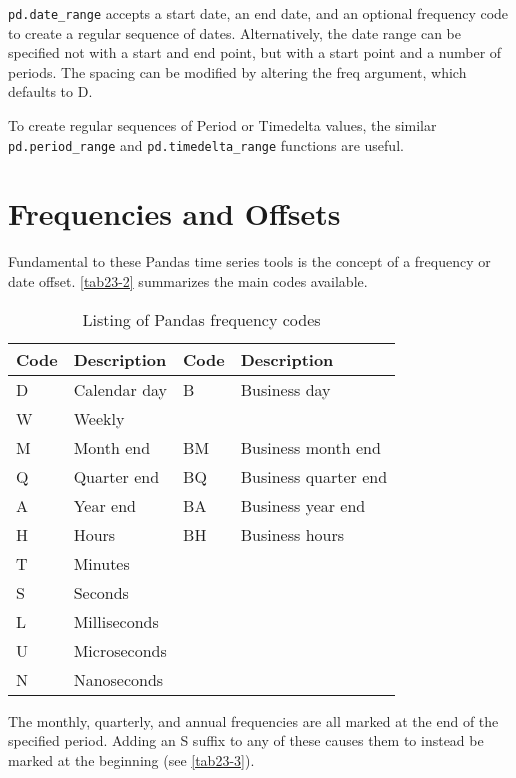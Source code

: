 \verb|pd.date_range| accepts a start date, an end date, and an optional
frequency code to create a regular sequence of dates. Alternatively, the date range can be specified not with a start and end point, but with
a start point and a number of periods. The spacing can be modified by altering the freq argument, which defaults to D.


To create regular sequences of Period or Timedelta values, the similar
\verb|pd.period_range| and \verb|pd.timedelta_range| functions are useful.

\section{Frequencies and Offsets}
Fundamental to these Pandas time series tools is the concept of a frequency or date
offset. \autoref{tab23-2} summarizes the main codes available.
\begin{table}
    \centering
    \caption{Listing of Pandas frequency codes}
    \label{tab23-2}
    \begin{tabular}{llll}
        \hline
        Code & Description  & Code & Description          \\
        \hline
        D    & Calendar day & B    & Business day         \\
        W    & Weekly       &      &                      \\
        M    & Month end    & BM   & Business month end   \\
        Q    & Quarter end  & BQ   & Business quarter end \\
        A    & Year end     & BA   & Business year end    \\
        H    & Hours        & BH   & Business hours       \\
        T    & Minutes      &      &                      \\
        S    & Seconds      &      &                      \\
        L    & Milliseconds &      &                      \\
        U    & Microseconds &      &                      \\
        N    & Nanoseconds  &      &                      \\
        \hline
    \end{tabular}
\end{table}

The monthly, quarterly, and annual frequencies are all marked at the end of the specified period. Adding an S suffix to any of these causes them to instead be marked at
the beginning (see \autoref{tab23-3}).


